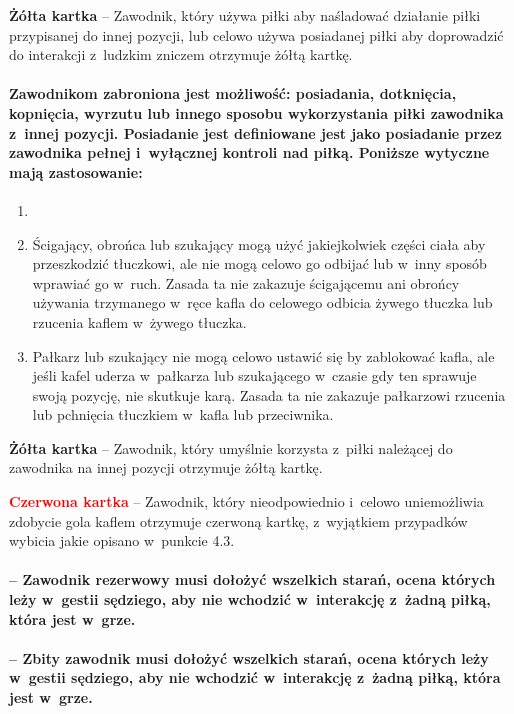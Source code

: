 \documentclass[12pt]{article}
\newcommand\redcard[1]{\bgroup\textcolor{red}{\textbf{#1}}}
\newcommand\yellowcard[1]{\bgroup\textcolor{darkyellow}{\textbf{#1}}}
\begin{document}
\yellowcard{Żółta kartka} -- Zawodnik, który używa piłki aby naśladować
działanie piłki przypisanej do innej pozycji, lub celowo używa
posiadanej piłki aby doprowadzić do interakcji z~ludzkim zniczem
otrzymuje żółtą kartkę.

\paragraph{Zawodnikom zabroniona jest możliwość: posiadania,
	dotknięcia, kopnięcia, wyrzutu lub innego sposobu wykorzystania piłki
	zawodnika z~innej pozycji. Posiadanie jest definiowane jest jako
	posiadanie przez zawodnika pełnej i~wyłącznej kontroli nad piłką.
	Poniższe wytyczne mają zastosowanie:}

\begin{enumerate}
	\item
	\item Ścigający, obrońca lub szukający mogą użyć jakiejkolwiek części
	      ciała aby przeszkodzić tłuczkowi, ale nie mogą celowo go odbijać lub w~inny sposób wprawiać go w~ruch. Zasada ta nie zakazuje ścigającemu ani
	      obrońcy używania trzymanego w~ręce kafla do celowego odbicia żywego
	      tłuczka lub rzucenia kaflem w~żywego tłuczka.
	\item
	      Pałkarz lub szukający nie mogą celowo ustawić się by zablokować kafla,
	      ale jeśli kafel uderza w~pałkarza lub szukającego w~czasie gdy ten
	      sprawuje swoją pozycję, nie skutkuje karą. Zasada ta nie zakazuje
	      pałkarzowi rzucenia lub pchnięcia tłuczkiem w~kafla lub przeciwnika.
\end{enumerate}

\yellowcard{Żółta kartka} -- Zawodnik, który umyślnie korzysta z~piłki należącej
do zawodnika na innej pozycji otrzymuje żółtą kartkę.

\redcard{Czerwona kartka} -- Zawodnik, który nieodpowiednio i~celowo
uniemożliwia zdobycie gola kaflem otrzymuje czerwoną kartkę, z~wyjątkiem
przypadków wybicia jakie opisano w~punkcie 4.3.

\paragraph{-- Zawodnik rezerwowy musi dołożyć wszelkich starań,
	ocena których leży w~gestii sędziego, aby nie wchodzić w~interakcję z~żadną piłką, która jest w~grze.}

\paragraph{-- Zbity zawodnik musi dołożyć wszelkich starań, ocena
	których leży w~gestii sędziego, aby nie wchodzić w~interakcję z~żadną
	piłką, która jest w~grze.}
\end{document}
